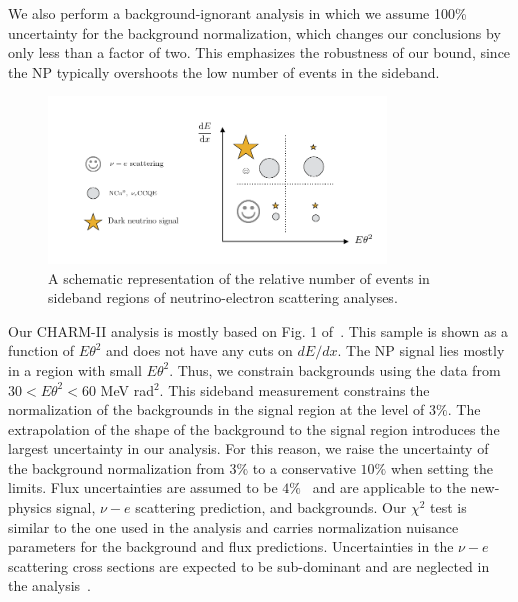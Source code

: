 We also perform a background-ignorant analysis in which we assume 100\% uncertainty for the background normalization, which changes our conclusions by only less than a factor of two. This emphasizes the robustness of our \minerva bound, since the NP typically overshoots the low number of events in the sideband.
%
\begin{figure}
 \includegraphics[width = 0.8\textwidth]{MiniBooNE_tests.pdf}
 \caption[Diagram of the sidebands in neutrino-electron scattering analyses.]{A schematic representation of the relative number of events in sideband regions of neutrino-electron scattering analyses.}
\end{figure}
%

Our CHARM-II analysis is mostly based on Fig. 1 of~\cite{Vilain:1994qy}. This sample is shown as a function of $E\theta^2$ and does not have any cuts on $dE/dx$. The NP signal lies mostly in a region with small $E\theta^2$. Thus, we constrain backgrounds using the data from $30 < E\theta^2 < 60$ MeV rad$^2$. This sideband measurement constrains the normalization of the backgrounds in the signal region at the level of $3\%$.
The extrapolation of the shape of the background to the signal region introduces the largest uncertainty in our analysis. For this reason, we raise the uncertainty of the background normalization from $3\%$ to a conservative $10 \%$ when setting the limits. Flux uncertainties are assumed to be $4\%$~\cite{Allaby:1987bb} and are applicable to the new-physics signal, $\nu-e$ scattering prediction, and backgrounds. 
Our $\chi^2$ test is similar to the one used in the \minerva analysis and carries normalization nuisance parameters for the background and flux predictions. Uncertainties in the $\nu-e$ scattering cross sections are expected to be sub-dominant and are neglected in the analysis~\cite{deGouvea:2006hfo}.

